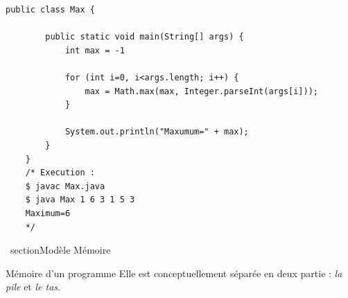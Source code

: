 \documentclass{report}
\begin{document}
\begin{EExample*}{}{}
\begin{lstlisting}[style=JavaDraculaWhite]
	public class Max {

	    public static void main(String[] args) {
			int max = -1
			
			for (int i=0, i<args.length; i++) {
				max = Math.max(max, Integer.parseInt(args[i]));
			}

			System.out.println("Maxumum=" + max);
		}
	}
	/* Execution :
	$ javac Max.java
	$ java Max 1 6 3 1 5 3
	Maximum=6
	*/
\end{lstlisting}
\end{EExample*}
% 
\
section{Modèle Mémoire}
\begin{Concept*}{Mémoire d'un programme}
Elle est conceptuellement séparée en deux partie : \textit{la pile} et \textit{le tas}.
\end{Concept*}
\end{document}
